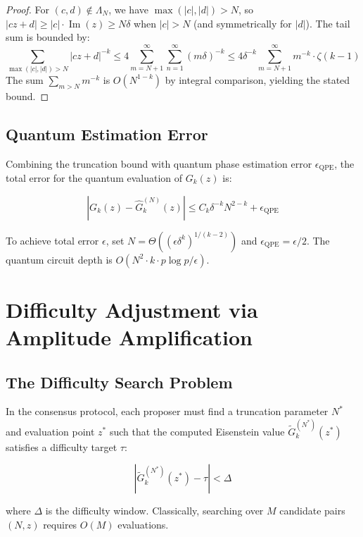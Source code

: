 \documentclass[11pt,a4paper]{article}
\begin{document}
\begin{proof}
For $(c,d) \notin \Lambda_N$, we have $\max(|c|,|d|) > N$, so
$|cz + d| \geq |c| \cdot \operatorname{Im}(z) \geq N\delta$ when
$|c| > N$ (and symmetrically for $|d|$). The tail sum is bounded by:
\[
\sum_{\max(|c|,|d|) > N} |cz+d|^{-k}
\leq 4 \sum_{m=N+1}^{\infty} \sum_{n=1}^{\infty} (m\delta)^{-k}
\leq 4\delta^{-k} \sum_{m=N+1}^{\infty} m^{-k} \cdot \zeta(k-1)
\]
The sum $\sum_{m>N} m^{-k}$ is $O(N^{1-k})$ by integral comparison,
yielding the stated bound.
\end{proof}

\subsection{Quantum Estimation Error}

Combining the truncation bound with quantum phase estimation error
$\epsilon_{\mathrm{QPE}}$, the total error for the quantum evaluation
of $G_k(z)$ is:

\begin{equation}\label{eq:total-error}
\left| G_k(z) - \hat{G}_k^{(N)}(z) \right|
\leq C_k \delta^{-k} N^{2-k} + \epsilon_{\mathrm{QPE}}
\end{equation}

To achieve total error $\epsilon$, set $N = \Theta((\epsilon
\delta^k)^{1/(k-2)})$ and $\epsilon_{\mathrm{QPE}} = \epsilon/2$.
The quantum circuit depth is
$O(N^2 \cdot k \cdot p \log p / \epsilon)$.

\section{Difficulty Adjustment via Amplitude Amplification}

\subsection{The Difficulty Search Problem}

In the consensus protocol, each proposer must find a truncation
parameter $N^*$ and evaluation point $z^*$ such that the computed
Eisenstein value $\tilde{G}_k^{(N^*)}(z^*)$ satisfies a difficulty
target $\tau$:

\[
\left| \tilde{G}_k^{(N^*)}(z^*) - \tau \right| < \Delta
\]

where $\Delta$ is the difficulty window. Classically, searching over
$M$ candidate pairs $(N, z)$ requires $O(M)$ evaluations.
\end{document}
